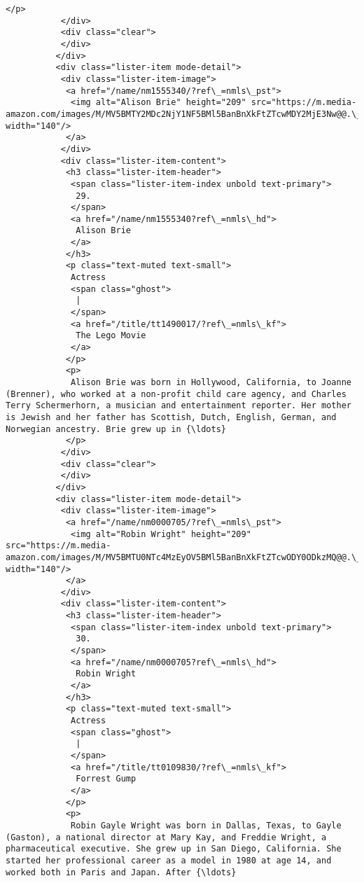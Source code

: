 \documentclass[11pt]{article}
\begin{document}
\begin{Verbatim}[commandchars=\\\{\}]
            </p>
           </div>
           <div class="clear">
           </div>
          </div>
          <div class="lister-item mode-detail">
           <div class="lister-item-image">
            <a href="/name/nm1555340/?ref\_=nmls\_pst">
             <img alt="Alison Brie" height="209" src="https://m.media-amazon.com/images/M/MV5BMTY2MDc2NjY1NF5BMl5BanBnXkFtZTcwMDY2MjE3Nw@@.\_V1\_UX140\_CR0,0,140,209\_AL\_.jpg" width="140"/>
            </a>
           </div>
           <div class="lister-item-content">
            <h3 class="lister-item-header">
             <span class="lister-item-index unbold text-primary">
              29.
             </span>
             <a href="/name/nm1555340?ref\_=nmls\_hd">
              Alison Brie
             </a>
            </h3>
            <p class="text-muted text-small">
             Actress
             <span class="ghost">
              |
             </span>
             <a href="/title/tt1490017/?ref\_=nmls\_kf">
              The Lego Movie
             </a>
            </p>
            <p>
             Alison Brie was born in Hollywood, California, to Joanne (Brenner), who worked at a non-profit child care agency, and Charles Terry Schermerhorn, a musician and entertainment reporter. Her mother is Jewish and her father has Scottish, Dutch, English, German, and Norwegian ancestry. Brie grew up in {\ldots}
            </p>
           </div>
           <div class="clear">
           </div>
          </div>
          <div class="lister-item mode-detail">
           <div class="lister-item-image">
            <a href="/name/nm0000705/?ref\_=nmls\_pst">
             <img alt="Robin Wright" height="209" src="https://m.media-amazon.com/images/M/MV5BMTU0NTc4MzEyOV5BMl5BanBnXkFtZTcwODY0ODkzMQ@@.\_V1\_UY209\_CR3,0,140,209\_AL\_.jpg" width="140"/>
            </a>
           </div>
           <div class="lister-item-content">
            <h3 class="lister-item-header">
             <span class="lister-item-index unbold text-primary">
              30.
             </span>
             <a href="/name/nm0000705?ref\_=nmls\_hd">
              Robin Wright
             </a>
            </h3>
            <p class="text-muted text-small">
             Actress
             <span class="ghost">
              |
             </span>
             <a href="/title/tt0109830/?ref\_=nmls\_kf">
              Forrest Gump
             </a>
            </p>
            <p>
             Robin Gayle Wright was born in Dallas, Texas, to Gayle (Gaston), a national director at Mary Kay, and Freddie Wright, a pharmaceutical executive. She grew up in San Diego, California. She started her professional career as a model in 1980 at age 14, and worked both in Paris and Japan. After {\ldots}

\end{Verbatim}
\end{document}
